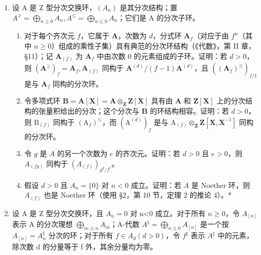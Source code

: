 
\begin{enumerate}
\def\labelenumi{\arabic{enumi}.}
\tightlist
\item
  设 A 是 Z 型分次交换环，\((A_{n})\) 是其分次结构；置 \(A^{\geq} = \bigoplus_{n \geq 0} A_{n}, A^{\leq} = \bigoplus_{n \leqslant 0} A_{n}\)；它们是 A 的分次子环。

\begin{enumerate}
\def\labelenumii{(\alph{enumii})}
\item
  对于每个齐次元 \(f\)，它属于 \(\mathbf{A}\)，次数为 \(d\)，分式环 \(\mathbf{A}_f\)（对应于由 \(f^n\)（其中 \(n \geqslant 0\)）组成的乘性子集）具有典范的分次环结构（《代数》，第 II 章，§11）；记 \(\mathbf{A}_{(f)}\) 为 \(\mathbf{A}_f\) 中由次数 0 的元素组成的子环。证明：若 \(d > 0\)，则 \((\mathbf{A}^{\geq})_f = \mathbf{A}_f, \mathbf{A}_{(f)}\) 同构于 \(\mathbf{A}^{(d)} / (f - 1)\mathbf{A}^{(d)}\)，且 \(((\mathbf{A}_f)^{\geq})_{f/1}\) 是与 \(\mathbf{A}_f\) 同构的分次环。
\item
  令多项式环 \(\mathbf{B} = \mathbf{A}[\mathbf{X}] = \mathbf{A} \otimes_{\mathbf{Z}} \mathbf{Z}[\mathbf{X}]\) 具有由 \(\mathbf{A}\) 和 \(\mathbf{Z}[\mathbf{X}]\) 上的分次结构的张量积给出的分次；这个分次与 \(\mathbf{B}\) 的环结构相容。证明：若 \(d > 0\)，则 \(\mathrm{B}_{(f)}\) 同构于 \((\mathrm{A}_f)^{\leqslant}\)，而 \((\mathrm{A}^{(d)})_f\) 是与 \(\mathrm{A}_{(f)} \otimes_{\mathbf{Z}} \mathbf{Z}[\mathbf{X}, \mathbf{X}^{-1}]\) 同构的分次环。
\item
  令 \(g\) 是 \(A\) 的另一个次数为 \(e\) 的齐次元。证明：若 \(d > 0\) 且 \(e > 0\)，则 \(A_{(fg)}\) 同构于 \((A_{(f)})_{g^d / f^e}\)。\\
  \item[* (d)] 假设 \(d > 0\) 且 \(A_n = \{0\}\) 对 \(n < 0\) 成立。证明：若 \(A\) 是 Noether 环，则 \(A_{(f)}\) 也是 Noether 环（使用 §2，第 10 节，定理 2 的推论 4）。*
\end{enumerate}

\item
  设 A 是 Z 型分次交换环，且 \(A_{n}=0\) 对 n\textless0 成立。对于所有 \(n\geqslant0\)，令 \(A_{[n]}\) 表示 A 的分次理想 \(\bigoplus_{m\geqslant n}A_{m}\)；A-代数 \(A^{\sharp}=\bigoplus_{n\geqslant0}A_{[n]}\) 是一个按 \(A_{[n]}=A_{n}^{\sharp}\) 分次的环；对于所有 \(f\in A_{d}(d>0)\)，令 \(f^{\sharp}\) 表示 \(A^{\sharp}\) 中的元素，除次数 d 的分量等于 f 外，其余分量均为零。


\end{enumerate}
